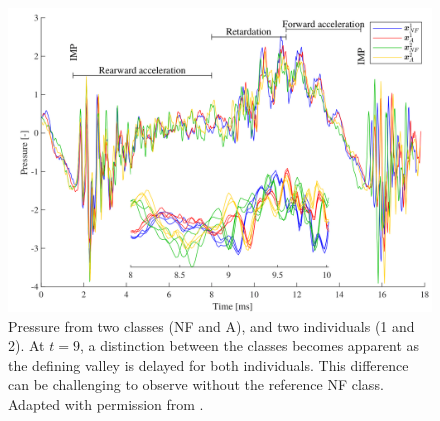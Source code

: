 \begin{figure}[!htb]
    \begin{center}
    \centerline{\includegraphics[width=\linewidth]{figures/drill_2.png}}
    \caption{Pressure from two classes (NF and A), and two individuals (1 and 2). 
    At $t = 9$, a distinction between the classes becomes apparent as the defining valley is delayed for both individuals. This difference can be challenging to observe without the reference NF class.
    Adapted with permission from \cite{jakobsson2022dataset}.
    }
    \label{fig:phm_2}
    \end{center}
\end{figure}
\vspace{-2em}
